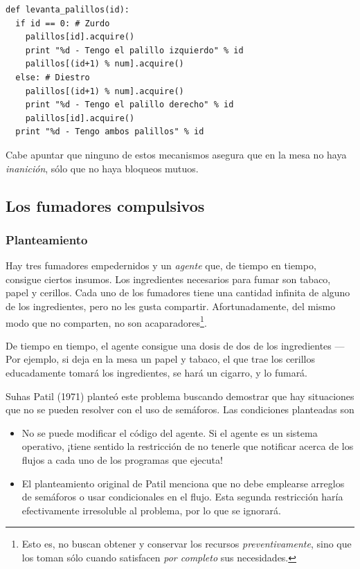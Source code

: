 \documentclass[11pt,fleqn]{book} %
\begin{document}
\begin{verbatim}
def levanta_palillos(id):
  if id == 0: # Zurdo
    palillos[id].acquire()
    print "%d - Tengo el palillo izquierdo" % id
    palillos[(id+1) % num].acquire()
  else: # Diestro
    palillos[(id+1) % num].acquire()
    print "%d - Tengo el palillo derecho" % id
    palillos[id].acquire()
  print "%d - Tengo ambos palillos" % id
\end{verbatim}

   Cabe apuntar que ninguno de estos mecanismos asegura que en la mesa
   no haya \emph{inanición}, sólo que no haya bloqueos mutuos.
\subsection{Los fumadores compulsivos}
\label{sec-3-3-8}
\subsubsection{Planteamiento}
\label{sec-3-3-8-1}

Hay tres fumadores empedernidos y un \emph{agente} que, de tiempo en
     tiempo, consigue ciertos insumos. Los ingredientes necesarios
     para fumar son tabaco, papel y cerillos. Cada uno de los
     fumadores tiene una cantidad infinita de alguno de los
     ingredientes, pero no les gusta compartir. Afortunadamente, del
     mismo modo que no comparten, no son acaparadores\footnote{Esto es, no
     buscan obtener y conservar los recursos \emph{preventivamente}, sino
     que los toman sólo cuando satisfacen \emph{por completo} sus
     necesidades. }.

     De tiempo en tiempo, el agente consigue una dosis de dos de los
     ingredientes — Por ejemplo, si deja en la mesa un papel y tabaco,
     el que trae los cerillos educadamente tomará los ingredientes, se
     hará un cigarro, y lo fumará.

     Suhas Patil (1971) planteó este problema buscando demostrar que
     hay situaciones que no se pueden resolver con el uso de
     semáforos. Las condiciones planteadas son

\begin{itemize}
\item No se puede  modificar el código del agente. Si el agente es un
       sistema operativo, ¡tiene sentido la restricción de no tenerle
       que notificar acerca de los flujos a cada uno de los programas
       que ejecuta!
\item El planteamiento original de Patil menciona que no debe
       emplearse arreglos de semáforos o usar condicionales en el
       flujo. Esta segunda restricción haría efectivamente irresoluble
       al problema, por lo que se ignorará.
\end{itemize}
\end{document}
